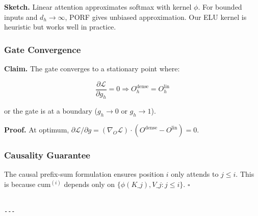 \textbf{Sketch.} Linear attention approximates softmax with kernel $\phi$. For 
bounded inputs and $d_h \to \infty$, PORF gives unbiased approximation. Our 
ELU kernel is heuristic but works well in practice.

\subsubsection{Gate Convergence}

\textbf{Claim.} The gate converges to a stationary point where:

\begin{equation}
\frac{\partial \mathcal{L}}{\partial g_h} = 0 \Rightarrow O^\text{dense}_h = O^\text{lin}_h
\end{equation}

or the gate is at a boundary ($g_h \to 0$ or $g_h \to 1$).

\textbf{Proof.} At optimum, $\partial \mathcal{L} / \partial g = (\nabla_O \mathcal{L}) \cdot (O^\text{dense} - O^\text{lin}) = 0$. 

\subsubsection{Causality Guarantee}

The causal prefix-sum formulation ensures position $i$ only attends to 
$j \le i$. This is because $\text{cum}^{(i)}$ depends only on $\{\phi(K\_j), 
V\_j : j \le i\}$. $\square$
\begin{lstlisting}

---
\end{lstlisting}